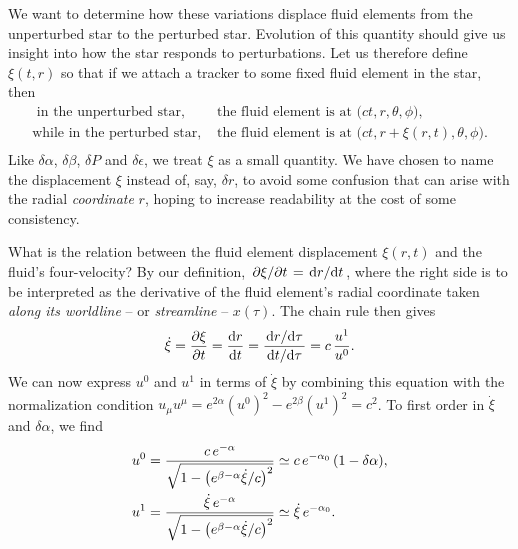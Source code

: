 We want to determine how these variations displace fluid elements from the unperturbed star to the perturbed star.
Evolution of this quantity should give us insight into how the star responds to perturbations.
Let us therefore define $\xi(t, r)$ so that if we attach a tracker to some fixed fluid element in the star, then
\begin{equation}
\begin{split}
	\text{      in the unperturbed star, } & \text{the fluid element is at $\big(ct,r,\theta,\phi\big)$,} \\
	\text{while in the   perturbed star, } & \text{the fluid element is at $\big(ct,r+\xi(r,t),\theta,\phi\big)$.} \\
\end{split}
\end{equation}
Like $\delta \alpha$, $\delta \beta$, $\delta P$ and $\delta \epsilon$, we treat $\xi$ as a small quantity.
We have chosen to name the displacement $\xi$ instead of, say, $\delta r$, to avoid some confusion that can arise with the radial \emph{coordinate} $r$, hoping to increase readability at the cost of some consistency.

What is the relation between the fluid element displacement $\xi(r,t)$ and the fluid's four-velocity?
By our definition, $\pdv{\xi}/{t} = \odv{r}/{t}$, where the right side is to be interpreted as the derivative of the fluid element's radial coordinate taken \emph{along its worldline} -- or \emph{streamline} -- $x(\tau)$.
The chain rule then gives
\begin{equation}
	\dot\xi = \pdv{\xi}{t} = \odv{r}{t} = \frac{\odv{r}/{\tau}}{\odv{t}/{\tau}} = c \, \frac{u^1}{u^0} .
\end{equation}
We can now express $u^0$ and $u^1$ in terms of $\dot\xi$ by combining this equation with the normalization condition $u_\mu u^\mu = e^{2 \alpha} \left( u^0 \right)^2 - e^{2 \beta} \left( u^1 \right)^2 = c^2$.
To first order in $\dot\xi$ and $\delta \alpha$, we find
\begin{subequations}
\begin{align}
	u^0 &= \frac{c \, e^{-\alpha}}{\sqrt{1 - \left( e^{\beta-\alpha} \dot\xi / c \right)^2 }} \simeq c \, e^{-\alpha_0} \, (1 - \delta \alpha), \label{eq:nstars:velocity_component_t} \\
	u^1 &= \frac{\dot\xi \, e^{-\alpha}}{\sqrt{1 - \left( e^{\beta-\alpha} \dot\xi / c \right)^2 }} \simeq \dot\xi \, e^{-\alpha_0} . \label{eq:nstars:velocity_component_r}
\end{align}
\label{eq:nstars:velocity_components}
\end{subequations}

